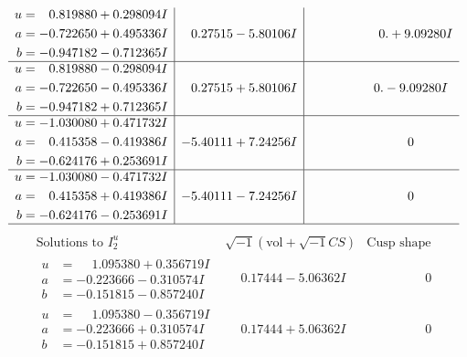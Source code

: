 \documentclass[1p]{elsarticle_modified}
\theoremstyle{definition}
\newcommand{\I}{\sqrt{-1}}
\begin{document}
$$\begin{array}{c|c|c}
\begin{aligned}
u &= \phantom{-}0.819880 + 0.298094 I \\
a &= -0.722650 + 0.495336 I \\
b &= -0.947182 - 0.712365 I\end{aligned}
 & \phantom{-}0.27515 - 5.80106 I & \phantom{-0.000000 -}0. + 9.09280 I \\ \hline\begin{aligned}
u &= \phantom{-}0.819880 - 0.298094 I \\
a &= -0.722650 - 0.495336 I \\
b &= -0.947182 + 0.712365 I\end{aligned}
 & \phantom{-}0.27515 + 5.80106 I & \phantom{-0.000000 } 0. - 9.09280 I \\ \hline\begin{aligned}
u &= -1.030080 + 0.471732 I \\
a &= \phantom{-}0.415358 - 0.419386 I \\
b &= -0.624176 + 0.253691 I\end{aligned}
 & -5.40111 + 7.24256 I & \phantom{-0.000000 } 0 \\ \hline\begin{aligned}
u &= -1.030080 - 0.471732 I \\
a &= \phantom{-}0.415358 + 0.419386 I \\
b &= -0.624176 - 0.253691 I\end{aligned}
 & -5.40111 - 7.24256 I & \phantom{-0.000000 } 0\\
 \hline 
 \end{array}$$\newpage$$\begin{array}{c|c|c}  
\text{Solutions to }I^u_{2}& \I (\text{vol} + \sqrt{-1}CS) & \text{Cusp shape}\\
 \hline 
\begin{aligned}
u &= \phantom{-}1.095380 + 0.356719 I \\
a &= -0.223666 - 0.310574 I \\
b &= -0.151815 - 0.857240 I\end{aligned}
 & \phantom{-}0.17444 - 5.06362 I & \phantom{-0.000000 } 0 \\ \hline\begin{aligned}
u &= \phantom{-}1.095380 - 0.356719 I \\
a &= -0.223666 + 0.310574 I \\
b &= -0.151815 + 0.857240 I\end{aligned}
 & \phantom{-}0.17444 + 5.06362 I & \phantom{-0.000000 } 0 \\ \hline\begin{aligned}

\end{aligned}
\end{array}$$
\end{document}
